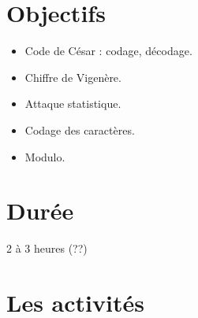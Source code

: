 \documentclass[class=report,crop=false, 12pt]{standalone}
\begin{document}



\section*{Objectifs}

\begin{itemize}
  \item Code de César : codage, décodage.
  \item Chiffre de Vigenère.
  \item Attaque statistique.
  \item Codage des caractères.
  \item Modulo.
\end{itemize}


\section*{Durée}

2 à 3 heures (??)

\section*{Les activités}
\end{document}
